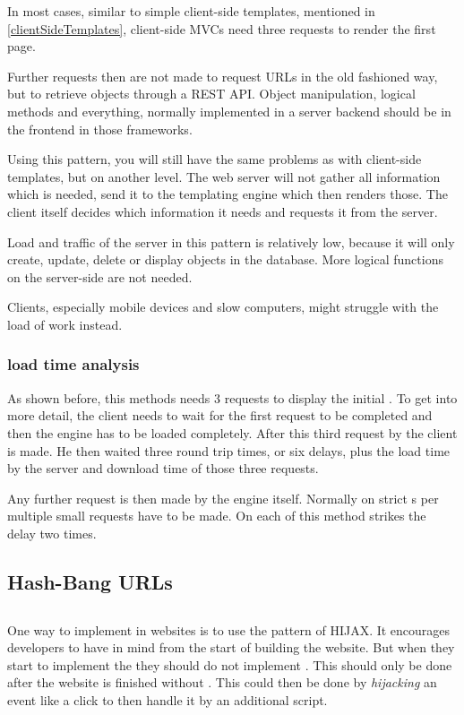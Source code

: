 In most cases, similar to simple client-side templates, mentioned in \ref{clientSideTemplates}, client-side MVCs need three requests to render the first page.

Further requests then are not made to request URLs in the old fashioned way, but to retrieve objects through a REST API. 
Object manipulation, logical methods and everything, normally implemented in a server backend should be in the frontend in those frameworks.

Using this pattern, you will still have the same problems as with client-side templates, but on another level.
The web server will not gather all information which is needed, send it to the templating engine which then renders those.
The client itself decides which information it needs and requests it from the server.

Load and traffic of the server in this pattern is relatively low, because it will only create, update, delete or display objects in the database. 
More logical functions on the server-side are not needed.

Clients, especially mobile devices and slow computers, might struggle with the load of work instead.

\subsubsection{load time analysis}
As shown before, this methods needs 3 requests to display the initial \webPage{}.
To get into more detail, the client needs to wait for the first request to be completed and then the \ajax{} engine has to be loaded completely.
After this third request by the client is made.
He then waited three round trip times, or six delays, plus the load time by the server and download time of those three requests.

Any further request is then made by the \ajax{} engine itself.
Normally on strict \clientSideMVC{}s per \webPage{} multiple small requests have to be made.
On each of this method strikes the delay two times.
 

\subsection{Hash-Bang URLs}

\subsection{\hijax{}}
One way to implement \ajax{} in websites is to use the pattern of HIJAX.
It encourages developers to have \ajax{} in mind from the start of building the website. 
But when they start to implement the \singlePageApplication{} they should do not implement \ajax{}.
This should only be done after the website is finished without \ajax{}.
This could then be done by \emph{hijacking} an event like a click to then handle it by an additional script.

